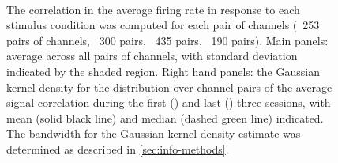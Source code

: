 \begin{figure}[htbp]%
    \centering
    \hspace*{\fill}
    \hspace*{\fill}\hspace{.2cm}\hspace*{\fill}
    \hspace*{\fill}
    \\
    \hspace*{\fill}
    \hspace*{\fill}\hspace{.2cm}\hspace*{\fill}
    \hspace*{\fill}
    \caption{
The correlation in the average firing rate in response to each stimulus condition was computed for each pair of channels (\protect{}~\num{253} pairs of channels, \protect{}~\num{300} pairs, \protect{}~\num{435} pairs, \protect{}~\num{190} pairs).
Main panels: average across all pairs of channels, with standard deviation indicated by the shaded region.
Right hand panels: the Gaussian kernel density for the distribution over channel pairs of the average signal correlation during the first () and last () three sessions, with mean (solid black line) and median (dashed green line) indicated.
The bandwidth for the Gaussian kernel density estimate was determined as described in \autoref{sec:info-methods}.
}
    \label{fig:pl_sigcor}
\end{figure}



